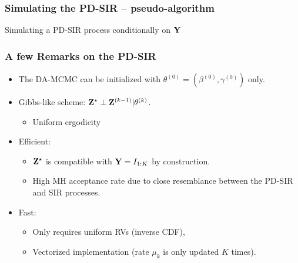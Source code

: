 \documentclass{beamer}
\begin{document}
\begin{frame} \frametitle{Simulating the PD-SIR -- pseudo-algorithm}  
	
	\begin{algorithm*}[H]
		\SetAlgoLined
		\caption{Simulating a PD-SIR process conditionally on $\mathbf{Y}$}
	\end{algorithm*}
		
\end{frame}


\begin{frame} \frametitle{A few Remarks on the PD-SIR}  
	
	\begin{itemize}
		\item The DA-MCMC can be initialized with $\theta^{(0)} = \left( \beta^{(0)}, \gamma^{(0)}\right)$ only.
		\item Gibbs-like scheme: $\mathbf{Z}^\star \perp \mathbf{Z}^{(k-1)} | \theta^{(k)}$.
		\begin{itemize}
			\item Uniform ergodicity
		\end{itemize}
		\item Efficient: 
		\begin{itemize}
			\item $\mathbf{Z}^\star$ is compatible with $\mathbf{Y} = I_{1:K}$ by construction.
			\item High MH acceptance rate due to close resemblance between the PD-SIR and SIR processes.			
		\end{itemize}
		\item Fast:
		\begin{itemize}
			\item Only requires uniform RVs (inverse CDF),
			\item Vectorized implementation (rate $\mu_k$ is only updated $K$ times).
		\end{itemize}
	\end{itemize}
\end{frame}
\end{document}
